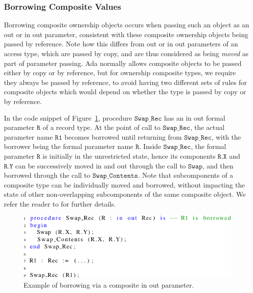 \documentclass{llncs}
\newcommand\var[1]{\ensuremath{\mathtt{#1}}}
\newcommand{\keyword}[1]{\textsf{#1}}
\begin{document}
\subsubsection{Borrowing Composite Values}
\label{subsubsec:borrowComposite}

Borrowing composite ownership objects occurs when passing such an object as an \keyword{out} or \keyword{in out} parameter, consistent with
these composite ownership objects being passed by reference. Note how this differs from \keyword{out} or \keyword{in out} parameters of an access type, which are passed by copy,
and are thus considered as being \textit{moved} as part of parameter passing. Ada normally allows composite objects to be passed either by copy or by reference, but for ownership composite types, we require they always be passed by reference, to avoid having two different sets of rules for composite objects which would depend on whether the type is passed by copy or by reference.

In the code snippet of Figure~\ref{fig:borrowingComposite}, procedure \var{Swap\_Rec} has an \keyword{in out} formal parameter \var{R} of a record type. At the point of
call to \var{Swap\_Rec}, the actual parameter name \var{R1} becomes borrowed until returning from \var{Swap\_Rec}, with the borrower being the formal parameter name \var{R}.  Inside \var{Swap\_Rec}, the formal parameter \var{R} is initially
in the unrestricted state, hence its components \var{R.X} and \var{R.Y} can be successively moved in and out through the call to \var{Swap}, and then borrowed through the call to \var{Swap\_Contents}.
Note that subcomponents of a composite type can be individually moved and borrowed, without impacting the state of other non-overlapping subcomponents of the same composite object.
We refer the reader to \cite{AI2018} for further details.

\begin{figure}[htb!]
\centering
   \includegraphics[]{borrowingComposite}
   \caption{Example of borrowing via a composite \keyword{in out} parameter.}
   \label{fig:borrowingComposite}
\end{figure}
\end{document}

